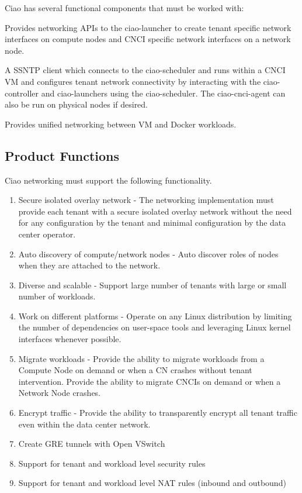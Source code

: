 \documentclass[10pt,letterpaper,onecolumn,draftclsnofoot]{IEEEtran}
\begin{document}
Ciao has several functional components that must be worked with:

\begin{description}[leftmargin=12em,style=nextline]
	\item[libsnnet]
		Provides networking APIs to the ciao-launcher to create tenant
		specific network interfaces on compute nodes and CNCI specific
		network interfaces on a network node.
	\item[ciao-cnci-agent]
		A SSNTP client which connects to the ciao-scheduler and runs
		within a CNCI VM and configures tenant network connectivity by
		interacting with the ciao-controller and ciao-launchers using
		the ciao-scheduler. The ciao-cnci-agent can also be run on
		physical nodes if desired.
	\item[docker-plugin]
		Provides unified networking between VM and Docker workloads.
\end{description}

\subsection{Product Functions}

Ciao networking must support the following functionality.

\begin{enumerate}
	\item Secure isolated overlay network - The networking implementation
		must provide each tenant with a secure isolated overlay network
		without the need for any configuration by the tenant and minimal
		configuration by the data center operator.
	\item Auto discovery of compute/network nodes - Auto discover roles of
		nodes when they are attached to the network.
	\item Diverse and scalable - Support large number of tenants with large
		or small number of workloads.
	\item Work on different platforms - Operate on any Linux distribution
		by limiting the number of dependencies on user-space tools and
		leveraging Linux kernel interfaces whenever possible.
	\item Migrate workloads - Provide the ability to migrate workloads from
		a Compute Node on demand or when a CN crashes without tenant
		intervention. Provide the ability to migrate CNCIs on demand or
		when a Network Node crashes.
	\item Encrypt traffic - Provide the ability to transparently encrypt all
		tenant traffic even within the data center network.
	\item Create GRE tunnels with Open VSwitch
	\item Support for tenant and workload level security rules
	\item Support for tenant and workload level NAT rules (inbound and outbound)
\end{enumerate}
\end{document}
